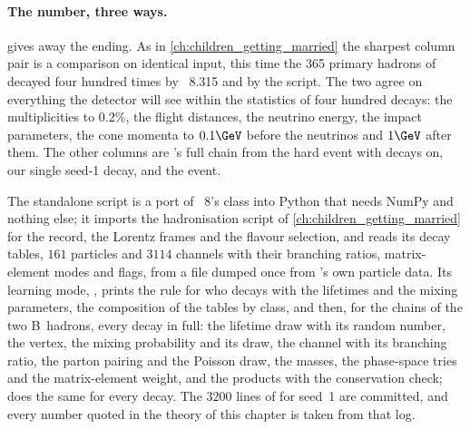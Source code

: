 \paragraph{The number, three ways.}
\label{sec:children_producing_grandchildren:validation}
\label{sec:children_producing_grandchildren:standalone_code}
 gives away the ending.
As in \cref{ch:children_getting_married} the sharpest column pair is a
comparison on identical input, this time the 365 primary hadrons of
 decayed four hundred times by \PYTHIA~8.315 and by the
script. The two agree on everything the detector will see within the
statistics of four hundred decays: the multiplicities to $0.2\%$, the
flight distances, the neutrino energy, the impact parameters, the cone
momenta to $0.1\GeV$ before the neutrinos and $1\GeV$ after them. The other
columns are \PYTHIA's full chain from the hard event with decays on, our
single seed-1 decay, and the \CMSSW event.

The standalone script is a port of \PYTHIA~8's  class
into Python that needs NumPy and nothing else; it imports the
hadronisation script of \cref{ch:children_getting_married} for the record,
the Lorentz frames and the flavour selection, and reads its decay tables,
$161$ particles and $3114$ channels with their branching ratios,
matrix-element modes and  flags, from a file dumped once from
\PYTHIA's own particle data. Its learning mode, , prints the rule
for who decays with the lifetimes and the mixing parameters, the
composition of the tables by class, and then, for the chains of the two
B~hadrons, every decay in full: the lifetime draw with its random number,
the vertex, the mixing probability and its draw, the channel with its
branching ratio, the parton pairing and the Poisson draw, the masses, the
phase-space tries and the matrix-element weight, and the products with the
conservation check;  does the same for every decay. The $3200$
lines of  for seed~1 are committed, and every number quoted in
the theory of this chapter is taken from that log.
\label{sec:children_producing_grandchildren:pythia}

